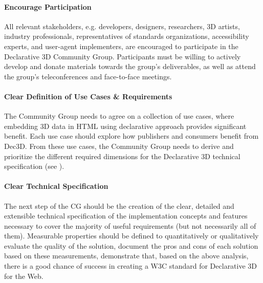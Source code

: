 \documentclass[review]{acmsiggraph}
\begin{document}
\paragraph{Encourage Participation}
All relevant stakeholders, e.g. developers, designers, researchers, 3D artists, industry professionals, representatives of standards organizations, accessibility experts, and user-agent implementers, are encouraged to participate in the Declarative 3D Community Group. Participants must be willing to actively develop and donate materials towards the group's deliverables, as well as attend the group's teleconferences and face-to-face meetings.

\paragraph{Clear Definition of Use Cases \& Requirements}
The Community Group needs to agree on a collection of use cases, where embedding 3D data in HTML using declarative approach provides significant benefit. Each use case should explore how publishers and consumers benefit from Dec3D. From these use cases, the Community Group needs to derive and prioritize the different required dimensions for the Declarative 3D technical specification (see \cite{JankowskiDec3D2012,LeFeuvreDec3D2012}).

\paragraph{Clear Technical Specification}
The next step of the CG should be the creation of the clear, detailed and extensible technical specification of the implementation concepts and features necessary to cover the majority of useful requirements (but not necessarily all of them). Measurable properties should be defined to quantitatively or qualitatively evaluate the quality of the solution, document the pros and cons of each solution based on these measurements, demonstrate that, based on the above analysis, there is a good chance of success in creating a W3C standard for Declarative 3D for the Web.
\end{document}
